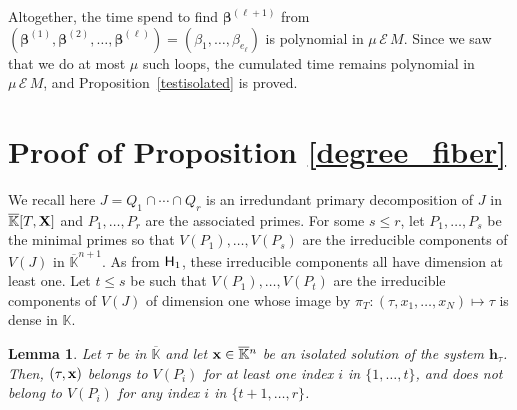 \documentclass[11pt]{article}
\numberwithin{Property}{section}
\numberwithin{Theorem}{section}
\numberwithin{Proposition}{section}
\newtheorem{Lemma}{Lemma}%
\numberwithin{Lemma}{section}
\numberwithin{Corollary}{section}
\numberwithin{Definition}{section}
\numberwithin{Remark}{section}
\numberwithin{Conjecture}{section}
\numberwithin{Problem}{section}
\numberwithin{Claim}{section}
\theoremstyle{definition}
\numberwithin{Example}{section}
\def\h {\ensuremath{\mathbf{h}}}
\renewcommand{\leq}{\leqslant}
\def\bar{\overline}
\newcommand{\field}{\mathbb{K}} %
\newcommand{\mat}[1]{\mathbf{\MakeUppercase{#1}}} %
\begin{document}
Altogether, the time spend to find $\bm{\beta}^{(\ell+1)}$ from $(\bm{\beta}^{(1)},\bm{\beta}^{(2)},\dots,\bm{\beta}^{(\ell)})=(\beta_{1},\dots,\beta_{e_\ell})$ is polynomial in $\mu\,\mathcal{E}\,M$. Since we saw that we do at most $\mu$ such loops, the cumulated time remains polynomial in $\mu\,\mathcal{E}\,M$, and Proposition~\ref{testisolated} is proved.
\section{Proof of Proposition \ref{degree_fiber}}
\label{sec:proofdegree}
We recall here $J=Q_1 \cap \cdots \cap Q_r$ is an irredundant primary decomposition of $J$ in $\bar{\field}[T,\mat{X}]$ and $P_1,\dots,P_r$ are the associated primes. For some $s \leq r$, let $P_1, \ldots, P_s$ be the minimal primes so that $V(P_1), \ldots, V(P_s)$ are the irreducible components of $V(J)$ in $\bar{\field}^{n+1}$. As from ${\sf H}_1$, these irreducible components all have dimension at least one. Let $t \leq s$ be such that $V(P_1),\dots,V(P_t)$ are the irreducible components of $V(J)$ of dimension one whose image by $\pi_T: (\tau,x_1,\dots,x_N) \mapsto \tau$ is dense in $\field$.
\begin{Lemma}\label{lemma:vPi}
  Let $\tau$ be in $\bar{\field}$ and let ${\bf x} \in \bar{\field}{}^n$ be an isolated solution of the system $\h_\tau$. Then, $(\tau,{\bf x})$ belongs to $V(P_i)$ for at least one index $i$ in $\{1,\dots,t\}$, and does not belong to $V(P_i)$ for any index $i$ in $\{t+1,\dots,r\}$.
\end{Lemma}
\end{document}
